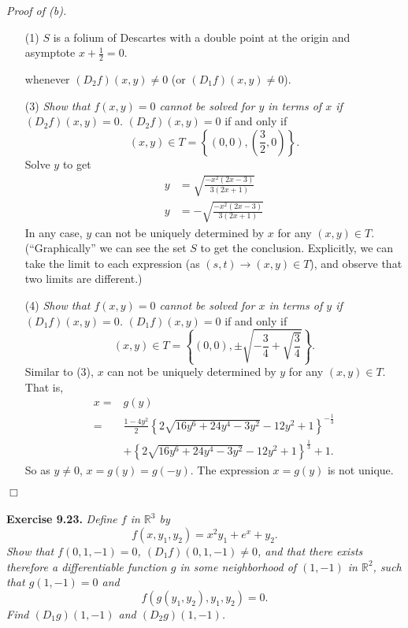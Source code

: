\documentclass{article}
\begin{document}
\emph{Proof of (b).}
\begin{enumerate}
\item[(1)]
  $S$ is a folium of Descartes
  with a double point at the origin and asymptote $x + \frac{1}{2} = 0$.

  whenever $(D_2 f)(x,y) \neq 0$ (or $(D_1 f)(x,y) \neq 0$).

\item[(3)]
  \emph{Show that $f(x,y) = 0$ cannot be solved for $y$ in terms of $x$
  if $(D_2 f)(x,y) = 0$.}
  $(D_2 f)(x,y) = 0$ if and only if
  \[
    (x,y) \in T = \left\{ (0,0), \left(\frac{3}{2},0\right) \right\}.
  \]
  Solve $y$ to get
  \begin{align*}
    y &= \sqrt{\frac{-x^2(2x-3)}{3(2x+1)}} \\
    y &= -\sqrt{\frac{-x^2(2x-3)}{3(2x+1)}}
  \end{align*}
  In any case, $y$ can not be uniquely determined by $x$ for any $(x,y) \in T$.
  (``Graphically'' we can see the set $S$ to get the conclusion.
  Explicitly, we can take the limit to each expression
  (as $(s,t) \to (x,y) \in T$), and observe that two limits are different.)

\item[(4)]
  \emph{Show that $f(x,y) = 0$ cannot be solved for $x$ in terms of $y$
  if $(D_1 f)(x,y) = 0$.}
  $(D_1 f)(x,y) = 0$ if and only if
  \[
    (x,y) \in T = \left\{ (0,0), \pm \sqrt{ -\frac{3}{4} + \sqrt{\frac{3}{4}}} \right\}.
  \]
  Similar to (3),
  $x$ can not be uniquely determined by $y$ for any $(x,y) \in T$.
  That is,
  \begin{align*}
    x =& g(y) \\
      =& \frac{1-4y^2}{2} \left\{ 2\sqrt{16y^6+24y^4-3y^2}-12y^2+1 \right\}^{-\frac{1}{3}} \\
      &+ \left\{ 2\sqrt{16y^6+24y^4-3y^2}-12y^2+1 \right\}^{\frac{1}{3}} + 1.
  \end{align*}
  So as $y \neq 0$, $x = g(y) = g(-y)$. The expression $x = g(y)$ is not unique.
\end{enumerate}
$\Box$ \\\\






\textbf{Exercise 9.23.}
\emph{Define $f$ in $\mathbb{R}^3$ by
\[
  f(x,y_1,y_2) = x^2 y_1 + e^x + y_2.
\]
Show that $f(0,1,-1) = 0$, $(D_1 f)(0, 1, -1) \neq 0$, and that
there exists therefore a differentiable function $g$ in some neighborhood of
$(1,-1)$ in $\mathbb{R}^2$, such that $g(1,-1) = 0$ and
\[
  f(g(y_1,y_2),y_1,y_2) = 0.
\]
Find $(D_1 g)(1,-1)$ and $(D_2 g)(1,-1)$.} \\
\end{document}
